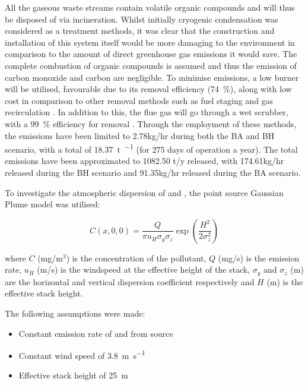All the gaseous waste 
streams contain volatile organic compounds and will thus be disposed of via incineration. Whilst initially cryogenic condensation was considered as a treatment methods, it was clear that the construction and installation of this system itself would be more damaging to the environment in comparison to the amount of direct greenhouse gas emissions it would save. The complete combustion of organic compounds is assumed and thus the emission of carbon monoxide and carbon are negligible. To minimise  emissions, a low  burner will be utilised, favourable due to its  removal efficiency (\SI{74}{\percent}), along with low cost in comparison to other  removal methods such as fuel staging and gas recirculation \cite{world_bank_group_pollution_1999}. In addition to this, the flue gas will go through a wet scrubber, with a \SI{99}{\percent} efficiency for  removal \cite{ceco_environmental_nox_nodate}. Through the employment of these methods, the  emissions have been limited to 2.78kg/hr during both the BA and BH scenario, with a total of \SI{18.37}{\tonne\per\year} (for 275 days of operation a year). The total  emissions have been approximated to 1082.50 t/y released, with 174.61kg/hr released during the BH scenario and 91.35kg/hr released during the BA scenario. 

To investigate the atmospheric dispersion of  and , the point source Gaussian Plume model was utilised:

\begin{equation}
C(x,0,0)= \frac{Q}{\pi u_{H} \sigma_{y} \sigma_{z}} \exp\left( \frac{H^2}{2\sigma_{z}^2}\right)
\end{equation}

\noindent where $C$ (mg/m$^3$) is the concentration of the pollutant, $Q$ (mg/s) is the emission rate, $u_H$ (m/s) is the windspeed at the effective height of the stack, $\sigma_{y}$ and $\sigma_{z}$ (m) are the horizontal and vertical dispersion coefficient respectively and $H$ (m) is the effective stack height. 

The following assumptions were made:

\begin{itemize}
\item Constant emission rate of  and  from source
\item Constant wind speed of \SI{3.8}{\m\per\s} \cite{weather_spark_average_nodate}
\item Effective stack height of \SI{25}{\m} 
\end{itemize}



